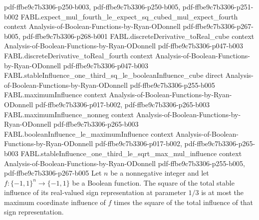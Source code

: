 \begin{theorem}
  {pdf-ffbe9c7b3306-p250-b003,
    pdf-ffbe9c7b3306-p250-b005,
    pdf-ffbe9c7b3306-p251-b002}
\proofstep
  {FABL.expect_mul_fourth_le_expect_sq_cubed_mul_expect_fourth}
  {context}
  {Analysis-of-Boolean-Functions-by-Ryan-ODonnell}
  {pdf-ffbe9c7b3306-p267-b005,
    pdf-ffbe9c7b3306-p268-b001}
\proofstep
  {FABL.discreteDerivative_toReal_cube}
  {context}
  {Analysis-of-Boolean-Functions-by-Ryan-ODonnell}
  {pdf-ffbe9c7b3306-p047-b003}
\proofstep
  {FABL.discreteDerivative_toReal_fourth}
  {context}
  {Analysis-of-Boolean-Functions-by-Ryan-ODonnell}
  {pdf-ffbe9c7b3306-p047-b003}
\proofstep
  {FABL.stableInfluence_one_third_sq_le_booleanInfluence_cube}
  {direct}
  {Analysis-of-Boolean-Functions-by-Ryan-ODonnell}
  {pdf-ffbe9c7b3306-p255-b005}
\proofstep
  {FABL.maximumInfluence}
  {context}
  {Analysis-of-Boolean-Functions-by-Ryan-ODonnell}
  {pdf-ffbe9c7b3306-p017-b002,
    pdf-ffbe9c7b3306-p265-b003}
\proofstep
  {FABL.maximumInfluence_nonneg}
  {context}
  {Analysis-of-Boolean-Functions-by-Ryan-ODonnell}
  {pdf-ffbe9c7b3306-p265-b003}
\proofstep
  {FABL.booleanInfluence_le_maximumInfluence}
  {context}
  {Analysis-of-Boolean-Functions-by-Ryan-ODonnell}
  {pdf-ffbe9c7b3306-p017-b002,
    pdf-ffbe9c7b3306-p265-b003}
\proofstep
  {FABL.stableInfluence_one_third_le_sqrt_max_mul_influence}
  {context}
  {Analysis-of-Boolean-Functions-by-Ryan-ODonnell}
  {pdf-ffbe9c7b3306-p255-b005,
    pdf-ffbe9c7b3306-p267-b005}
Let $n$ be a nonnegative integer and let $f:\{-1,1\}^n\to\{-1,1\}$ be a Boolean
function. The square of the total stable influence of its real-valued sign
representation at parameter $1/3$ is at most the maximum coordinate influence of $f$
times the square of the total influence of that sign representation.
\end{theorem}

